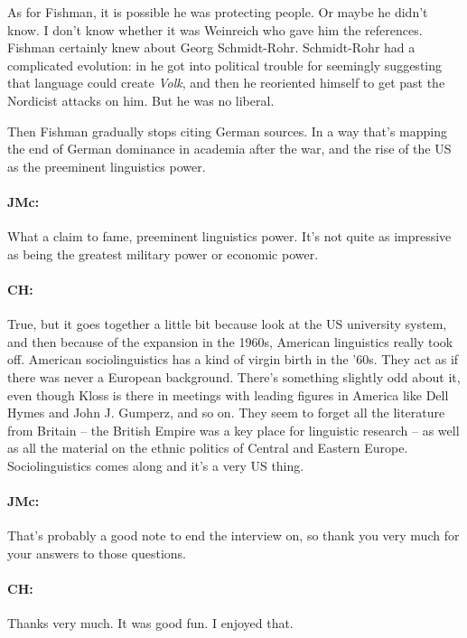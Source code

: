 \documentclass[output=paper]{langscibook}
\begin{document}
As for Fishman, it is possible he was protecting people. Or maybe he didn’t know. I don’t know whether it was Weinreich who gave him the references. Fishman certainly knew about Georg Schmidt-Rohr. Schmidt-Rohr had a complicated evolution: in \citeyear{schmidt-rohr1932a} he got into political trouble for seemingly suggesting that language could create \textit{Volk}, and then he reoriented himself to get past the Nordicist attacks on him. But he was no liberal. 

Then Fishman gradually stops citing German sources. In a way that’s mapping the end of German dominance in academia after the war, and the rise of the US as the preeminent linguistics power.

\paragraph*{JMc:} What a claim to fame, preeminent linguistics power. It’s not quite as impressive as being the greatest military power or economic power.

\paragraph*{CH:} True, but it goes together a little bit because look at the US university system, and then because of the expansion in the 1960s, American linguistics really took off. American sociolinguistics has a kind of virgin birth in the ’60s. They act as if there was never a European background. There’s something slightly odd about it, even though Kloss is there in meetings with leading figures in America like Dell Hymes and John J. Gumperz, and so on. They seem to forget all the literature from Britain – the British Empire was a key place for linguistic research – as well as all the material on the ethnic politics of Central and Eastern Europe. Sociolinguistics comes along and it’s a very US thing.

\paragraph*{JMc:} That’s probably a good note to end the interview on, so thank you very much for your answers to those questions.

\paragraph*{CH:} Thanks very much. It was good fun. I enjoyed that.

\nocite{boas1911a}
\nocite{boas1911b}
\nocite{fishman1964a}
\nocite{kloss1941a}
\nocite{muehlhausen1939a}
\nocite{philipson1992a}
\nocite{sapir1949a}
\nocite{schmidt-rohr1932a}
\nocite{schmidt-rohr1933a}
\nocite{weinreich1946a}
\nocite{weinreich1953a}
\nocite{weisgerber1939a}
\nocite{burleigh1988a}
\nocite{hutton1999a}
\nocite{hutton2005a}
\nocite{knobloch2005a}
\nocite{weiser2018a}


\sloppy
\PrintPrimarySources{}
\PrintSecondarySources{}
\end{document}
